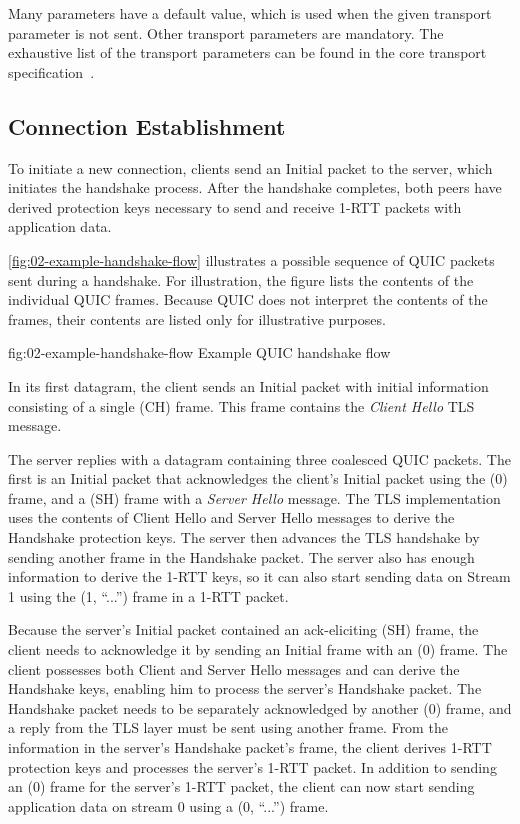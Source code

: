 Many parameters have a default value, which is used when the given transport parameter is not sent.
Other transport parameters are mandatory. The exhaustive list of the transport parameters can be
found in the core transport specification~\cite[Section~7.4]{draft-ietf-quic-transport}.

\subsection{Connection Establishment}\label{sec:02-connection-establishment}

To initiate a new connection, clients send an Initial packet to the server, which initiates the
handshake process. After the handshake completes, both peers have derived protection keys necessary
to send and receive 1-RTT packets with application data.

\autoref{fig:02-example-handshake-flow} illustrates a possible sequence of QUIC packets sent during
a handshake. For illustration, the figure lists the contents of the individual QUIC frames. Because
QUIC does not interpret the contents of the \CRYPTO{} frames, their contents are listed only for
illustrative purposes.

\begin{myFigure} {fig:02-example-handshake-flow} {Example QUIC handshake flow}

\resizebox{\linewidth}{!}{}

\end{myFigure}

In its first datagram, the client sends an Initial packet with initial information consisting of a
single \CRYPTO{}(CH) frame. This frame contains the \textit{Client Hello} TLS message.

The server replies with a datagram containing three coalesced QUIC packets. The first is an Initial
packet that acknowledges the client's Initial packet using the \ACK{}(0) frame, and a \CRYPTO{}(SH)
frame with a \textit{Server Hello} message. The TLS implementation uses the contents of Client Hello
and Server Hello messages to derive the Handshake protection keys. The server then advances the TLS
handshake by sending another \CRYPTO{} frame in the Handshake packet. The server also has enough
information to derive the 1-RTT keys, so it can also start sending data on Stream 1 using the
\STREAM{}(1, ``...'') frame in a 1-RTT packet.

Because the server's Initial packet contained an ack-eliciting \CRYPTO{}(SH) frame, the client needs
to acknowledge it by sending an Initial frame with an \ACK{}(0) frame. The client possesses both
Client and Server Hello messages and can derive the Handshake keys, enabling him to process the
server's Handshake packet. The Handshake packet needs to be separately acknowledged by another
\ACK{}(0) frame, and a reply from the TLS layer must be sent using another \CRYPTO{} frame. From the
information in the server's Handshake packet's \CRYPTO{} frame, the client derives 1-RTT protection
keys and processes the server's 1-RTT packet. In addition to sending an \ACK{}(0) frame for the
server's 1-RTT packet, the client can now start sending application data on stream 0 using a
\STREAM{}(0, ``...'') frame.

